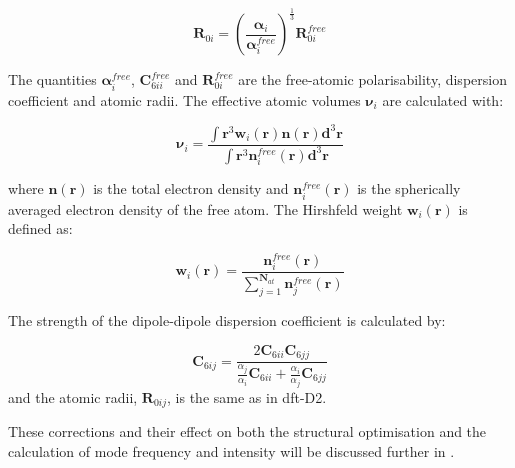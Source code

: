\begin{equation}
\boldsymbol{R}_{0i} = \left(\frac{\boldsymbol{\alpha}_i}{\boldsymbol{\alpha}_i^{free}}\right)^{\frac{1}{3}} \boldsymbol{R}_{0i}^{free}
\end{equation}

The quantities \( \boldsymbol{\alpha}_i^{free} \), \( \boldsymbol{C}_{6ii}^{free} \) and \( \boldsymbol{R}_{0i}^{free} \) are the free-atomic polarisability, dispersion coefficient and atomic radii. The effective atomic volumes \( \boldsymbol{\nu}_i \) are calculated with:

\begin{equation}
\boldsymbol{\nu}_i = \frac{\int \boldsymbol{r}^3 \boldsymbol{w}_i (\mathbf{r}) \boldsymbol{n} (\mathbf{r}) \boldsymbol{d}^3\mathbf{r}}{\int \boldsymbol{r}^3 \boldsymbol{n}_i^{free}(\mathbf{r}) \boldsymbol{d}^3 \mathbf{r}}
\end{equation}

where \(\boldsymbol{n}(\mathbf{r})\) is the total electron density and \(\boldsymbol{n}_i^{free}(\mathbf{r})\) is the spherically averaged electron density of the free atom. The Hirshfeld weight \(\boldsymbol{w}_i (\mathbf{r})\) is defined as:

\begin{equation}
\boldsymbol{w}_i (\mathbf{r}) = \frac{\boldsymbol{n}_i^{free}(\mathbf{r})}{\sum_{j=1}^{\boldsymbol{N}_{at}} \boldsymbol{n}_j^{free} (\mathbf{r})}
\end{equation}

The strength of the dipole-dipole dispersion coefficient is calculated by:

\begin{equation}
\boldsymbol{C}_{6ij} = \frac{2 \boldsymbol{C}_{6ii} \boldsymbol{C}_{6jj}}{{\frac{\alpha_j}{\alpha_i}} \boldsymbol{C}_{6ii} + \frac{\alpha_i}{\alpha_j} \boldsymbol{C}_{6jj}}
\end{equation}
and the atomic radii, \( \boldsymbol{R}_{0ij} \), is the same as in \acrshort{dft}-D2.

These corrections and their effect on both the structural optimisation and the calculation of mode frequency and intensity will be discussed further in .


